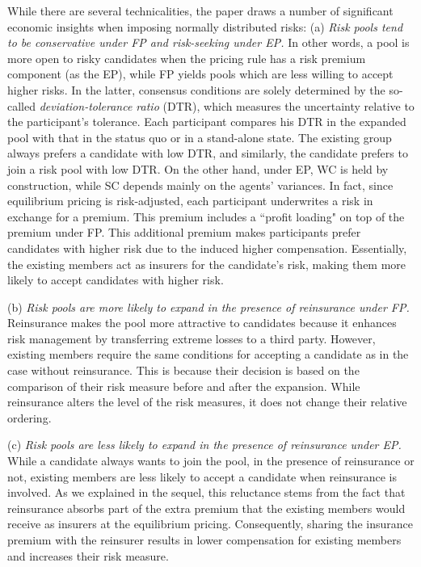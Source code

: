 \documentclass[fleqn,mnsc,nonblindrev]{informs4}
\begin{document}
While there are several technicalities, the paper draws a number of significant economic insights when imposing normally distributed risks: (a) {\it Risk pools tend to be conservative under FP and risk-seeking under EP.}    {In other words, a pool is more open to risky candidates when the pricing rule has a risk premium component (as the EP), while FP yields pools which are less willing to accept higher risks. In the latter,} consensus conditions are solely determined by the so-called {\it deviation-tolerance ratio}   {(DTR)}, which measures the uncertainty relative to the participant's tolerance. Each participant compares his DTR in the expanded pool with that in the status quo or in a stand-alone state. The existing group always prefers a candidate with low DTR, and similarly, the candidate prefers to join a risk pool with low DTR. On the other hand, under EP, WC is held by construction, while SC depends mainly on the agents' variances. In fact, since equilibrium pricing is risk-adjusted, each participant underwrites a risk in exchange for a premium. This premium includes a ``profit loading" on top of the premium under FP. This additional premium makes participants prefer candidates with higher risk due to the induced higher compensation. Essentially, the existing members act as insurers for the candidate's risk, making them more likely to accept candidates with higher risk.

(b) {\it Risk pools are more likely to expand in the presence of reinsurance under FP.} Reinsurance makes the pool more attractive to candidates because it enhances risk management by transferring extreme losses to a third party. However, existing members require the same conditions for accepting a candidate as in the case without reinsurance. This is because their decision is based on the comparison of their risk measure before and after the expansion. While reinsurance alters the level of the risk measures, it does not change their relative ordering. 

(c) {\it Risk pools are less likely to expand in the presence of reinsurance under EP.} While a candidate always wants to join the pool, in the presence of reinsurance or not, existing members are less likely to accept a candidate when reinsurance is involved. As we explained in the sequel, this reluctance stems from the fact that reinsurance absorbs part of the extra premium that the existing members would receive as insurers at the equilibrium pricing. Consequently, sharing the insurance premium with the reinsurer results in lower compensation for existing members and increases their risk measure.  
\end{document}
